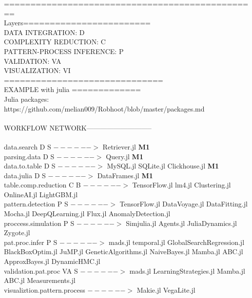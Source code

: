 \documentclass[english,12pt]{article}
\begin{document}
\begin{mybox}
\begin{singlespace}
\begin{small}
================================================
 \\
Layers========================\\
DATA INTEGRATION: D \\
COMPLEXITY REDUCTION: C \\
PATTERN-PROCESS INFERENCE: P \\
VALIDATION: VA \\
VISUALIZATION: VI \\
==============================
 \\
EXAMPLE with julia ============= \\
Julia packages: \\
https://github.com/melian009/Robhoot/blob/master/packages.md \\
 \\
WORKFLOW NETWORK----------------------------- \\
 \\
data.search D S                $------>$ Retriever.jl {\bf M1} \\
parsing.data D S               $------>$ Query.jl  {\bf M1} \\
data.to.table D S              $------>$ MySQL.jl SQLite.jl Clickhouse.jl {\bf M1} \\
data.julia D S                 $------>$ DataFrames.jl {\bf M1} \\
table.comp.reduction C B       $------>$ TensorFlow.jl lm4.jl Clustering.jl OnlineAI.jl LightGBM.jl \\
pattern.detection P S          $------>$ TensorFlow.jl DataVoyage.jl DataFitting.jl Mocha.jl DeepQLearning.jl Flux.jl AnomalyDetection.jl \\
proccess.simulation P S        $------>$ Simjulia.jl Agents.jl JuliaDynamics.jl Zygote.jl \\
pat.proc.infer P S             $------>$ mads.jl temporal.jl GlobalSearchRegression.jl BlackBoxOptim.jl JuMP.jl GeneticAlgorithms.jl NaiveBayes.jl Mamba.jl ABC.jl ApproxBayes.jl DynamicHMC.jl \\
validation.pat.proc VA S       $------>$ mads.jl LearningStrategies.jl Mamba.jl ABC.jl Measurements.jl \\
visualiztion.pattern.process   $------>$ Makie.jl VegaLite.jl \\
\end{small}
\end{singlespace}
\end{mybox}


\newpage
\end{document}
